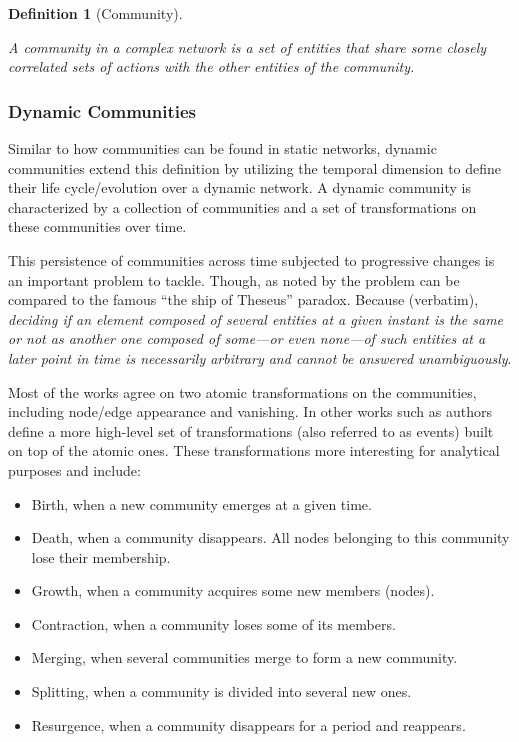 \documentclass[
acmsmall,
nonacm,
screen,
acmthm]{acmart}
\providecommand{\tightlist}{%
\setlength{\itemsep}{0pt}\setlength{\parskip}{0pt}}
\newtheorem{dfn}{Definition}
\begin{document}
\begin{dfn}[Community]\label{dfn:community} 

A community in a complex network is a set of entities that share some
closely correlated sets of actions with the other entities of the
community.

\end{dfn}

\hypertarget{dynamic-communities}{%
\subsubsection{Dynamic Communities}\label{dynamic-communities}}

Similar to how communities can be found in static networks, dynamic
communities extend this definition by utilizing the temporal dimension
to define their life cycle/evolution over a dynamic network. A dynamic
community is characterized by a collection of communities and a set of
transformations on these communities over time.

This persistence of communities across time subjected to progressive
changes is an important problem to tackle. Though, as noted by
\citep{rossettiCommunityDiscoveryDynamic2018} the problem can be
compared to the famous ``the ship of Theseus'' paradox. Because
(verbatim), \emph{deciding if an element composed of several entities at
a given instant is the same or not as another one composed of some---or
even none---of such entities at a later point in time is necessarily
arbitrary and cannot be answered unambiguously}.

Most of the works agree on two atomic transformations on the
communities, including node/edge appearance and vanishing. In other
works such as
\citep{pallaQuantifyingSocialGroup2007, asurEventbasedFrameworkCharacterizing2009, cazabetUsingDynamicCommunity2012}
authors define a more high-level set of transformations (also referred
to as events) built on top of the atomic ones. These transformations
more interesting for analytical purposes and include:

\begin{itemize}
\tightlist
\item
  Birth, when a new community emerges at a given time.~
\item
  Death, when a community disappears. All nodes belonging to this
  community lose their membership.
\item
  Growth, when a community acquires some new members (nodes).
\item
  Contraction, when a community loses some of its members.
\item
  Merging, when several communities merge to form a new community.
\item
  Splitting, when a community is divided into several new ones.
\item
  Resurgence, when a community disappears for a period and reappears.
\end{itemize}
\end{document}
